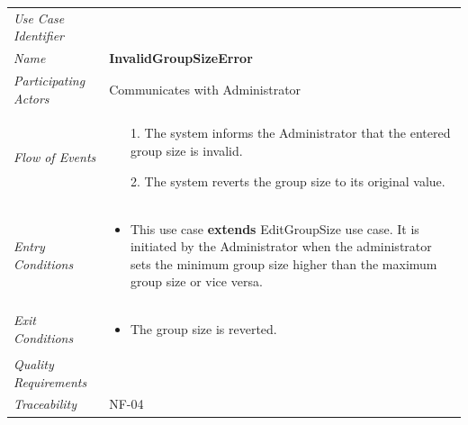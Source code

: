 \documentclass[12pt,letterpaper]{article}
\begin{document}
\begin{center}
	\begin{tabu} to 
		\toprule
		Use Case Identifier & \invalidgroupsizeerror{} \\
		Name & {\bf InvalidGroupSizeError} \\
		Participating Actors & Communicates with Administrator \\
		Flow of Events & 
		\begin{minipage}[t]{\linewidth}
		    \begin{enumerate}
			    \item[1.] The system informs the Administrator that the entered group size is invalid.
			    \item[2.] The system reverts the group size to its original value.
			\end{enumerate}
        \end{minipage} \\

		Entry Conditions &
		\begin{minipage}[t]{\linewidth}
			\begin{itemize}
			    \item This use case \textbf{extends} EditGroupSize use case. It is initiated by the Administrator when the administrator sets the minimum group size higher than the maximum group size or vice versa.
	        \end{itemize}
        \end{minipage} \\

		Exit Conditions &
		\begin{minipage}[t]{\linewidth}
			\begin{itemize}
			    \item The group size is reverted.
	        \end{itemize}
        \end{minipage} \\

		Quality Requirements & \\

		Traceability & NF-04 \\
		\toprule
	\end{tabu}
\end{center}
\end{document}
